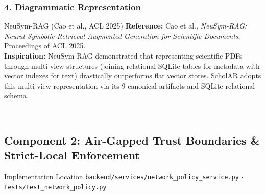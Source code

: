 \documentclass[11pt,a4paper]{article}
\begin{document}
\subsubsection{4. Diagrammatic Representation}
\begin{center}
\end{center}

\begin{inspirationbox}{NeuSym-RAG (Cao et al., ACL 2025)}
\textbf{Reference:} Cao et al., \emph{NeuSym-RAG: Neural-Symbolic Retrieval-Augmented Generation for Scientific Documents}, Proceedings of ACL 2025.\\
\textbf{Inspiration:} NeuSym-RAG demonstrated that representing scientific PDFs through multi-view structures (joining relational SQLite tables for metadata with vector indexes for text) drastically outperforms flat vector stores. ScholAR adopts this multi-view representation via its 9 canonical artifacts and SQLite relational schema.
\end{inspirationbox}

---

\subsection{Component 2: Air-Gapped Trust Boundaries \& Strict-Local Enforcement}
\begin{codebox}{Implementation Location}
\texttt{backend/services/network\_policy\_service.py} $\cdot$ \texttt{tests/test\_network\_policy.py}
\end{codebox}
\end{document}
